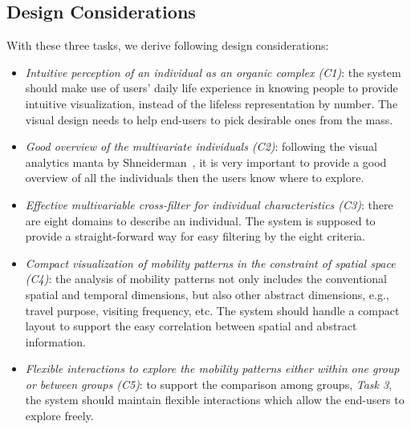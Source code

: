 \subsection{Design Considerations}

With these three tasks, we derive following design considerations:

\begin{itemize}
\item \textit{Intuitive perception of an individual as an organic complex (C1)}: the system should make use of users' daily life experience in knowing people to provide intuitive visualization, instead of the lifeless representation by number. The visual design needs to help end-users to pick desirable ones from the mass.
\item \textit{Good overview of the multivariate individuals (C2)}: following the visual analytics manta by Shneiderman~\citep{RN459}, it is very important to provide a good overview of all the individuals then the users know where to explore.
\item \textit{Effective multivariable cross-filter for individual characteristics (C3)}: there are eight domains to describe an individual. The system is supposed to provide a straight-forward way for easy filtering by the eight criteria.
\item \textit{Compact visualization of mobility patterns in the constraint of spatial space (C4)}: the analysis of mobility patterns not only includes the conventional spatial and temporal dimensions, but also other abstract dimensions, e.g., travel purpose, visiting frequency, etc. The system should handle a compact layout to support the easy correlation between spatial and abstract information.
\item \textit{Flexible interactions to explore the mobility patterns either within one group or between groups (C5)}: to support the comparison among groups, \textit{Task 3}, the system should maintain flexible interactions which allow the end-users to explore freely.
\end{itemize}


